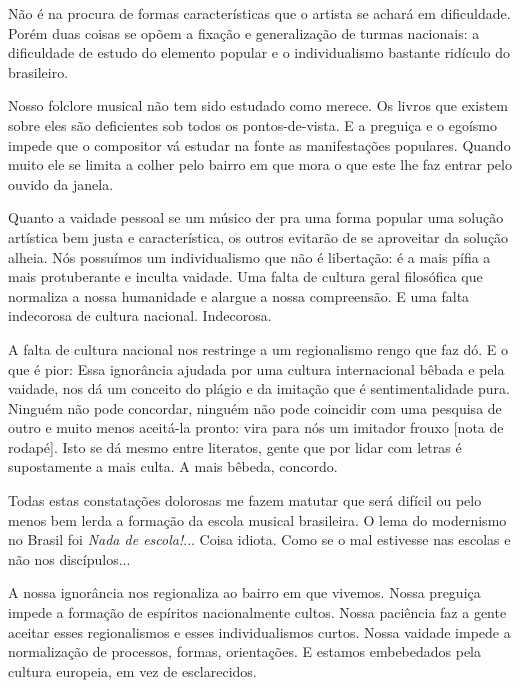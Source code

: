 Não é na procura de formas características que o artista se achará em
dificuldade. Porém duas coisas se opõem a fixação e generalização de
turmas nacionais: a dificuldade de estudo do elemento popular e o
individualismo bastante ridículo do brasileiro.

Nosso folclore musical não tem sido estudado como merece. Os livros que
existem sobre eles são deficientes sob todos os pontos-de-vista. E a
preguiça e o egoísmo impede que o compositor vá estudar na fonte as
manifestações populares. Quando muito ele se limita a colher pelo bairro
em que mora o que este lhe faz entrar pelo ouvido da janela.

Quanto a vaidade pessoal se um músico der pra uma forma popular uma
solução artística bem justa e característica, os outros evitarão de se
aproveitar da solução alheia. Nós possuímos um individualismo que não é
libertação: é a mais pífia a mais protuberante e inculta vaidade. Uma
falta de cultura geral filosófica que normaliza a nossa humanidade e
alargue a nossa compreensão. E uma falta indecorosa de cultura nacional.
Indecorosa.~

A falta de cultura nacional nos restringe a um regionalismo rengo que
faz dó. E o que é pior: Essa ignorância ajudada por uma cultura
internacional bêbada e pela vaidade, nos dá um conceito do plágio e da
imitação que é sentimentalidade pura. Ninguém não pode concordar,
ninguém não pode coincidir com uma pesquisa de outro e muito menos
aceitá-la pronto: vira para nós um imitador frouxo {[}nota de rodapé{]}.
Isto se dá mesmo entre literatos, gente que por lidar com letras é
supostamente a mais culta. A mais bêbeda, concordo.~

Todas estas constatações dolorosas me fazem matutar que será difícil ou
pelo menos bem lerda a formação da escola musical brasileira. O lema do
modernismo no Brasil foi \emph{Nada de escola!}... Coisa idiota. Como se
o mal estivesse nas escolas e não nos discípulos...~

A nossa ignorância nos regionaliza ao bairro em que vivemos. Nossa
preguiça impede a formação de espíritos nacionalmente cultos. Nossa
paciência faz a gente aceitar esses regionalismos e esses
individualismos curtos. Nossa vaidade impede a normalização de
processos, formas, orientações. E estamos embebedados pela cultura
europeia, em vez de esclarecidos.~

